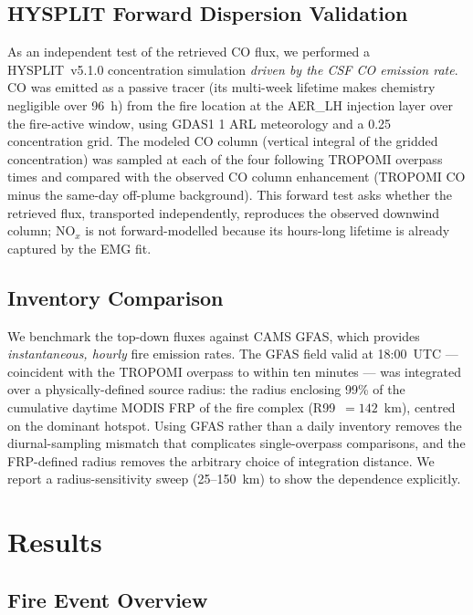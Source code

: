 \documentclass[draft]{agujournal2019}
\newcommand{\NOx}{NO$_x$}
\begin{document}
\subsection{HYSPLIT Forward Dispersion Validation}
\label{sec:hysplit}

As an independent test of the retrieved CO flux, we performed a HYSPLIT~v5.1.0 \citep{Stein2015} concentration simulation \emph{driven by the CSF CO emission rate}. CO was emitted as a passive tracer (its multi-week lifetime makes chemistry negligible over 96~h) from the fire location at the AER\_LH injection layer over the fire-active window, using GDAS1 1\degree{} ARL meteorology and a 0.25\degree{} concentration grid. The modeled CO column (vertical integral of the gridded concentration) was sampled at each of the four following TROPOMI overpass times and compared with the observed CO column enhancement (TROPOMI CO minus the same-day off-plume background). This forward test asks whether the retrieved flux, transported independently, reproduces the observed downwind column; \NOx{} is not forward-modelled because its hours-long lifetime is already captured by the EMG fit.

\subsection{Inventory Comparison}
\label{sec:inventory}

We benchmark the top-down fluxes against CAMS GFAS, which provides \emph{instantaneous, hourly} fire emission rates. The GFAS field valid at 18:00~UTC --- coincident with the TROPOMI overpass to within ten minutes --- was integrated over a physically-defined source radius: the radius enclosing 99\% of the cumulative daytime MODIS FRP of the fire complex (R99~$=142$~km), centred on the dominant hotspot. Using GFAS rather than a daily inventory removes the diurnal-sampling mismatch that complicates single-overpass comparisons, and the FRP-defined radius removes the arbitrary choice of integration distance. We report a radius-sensitivity sweep (25--150~km) to show the dependence explicitly.

\section{Results}
\label{sec:results}

\subsection{Fire Event Overview}
\label{sec:overview}
\end{document}
